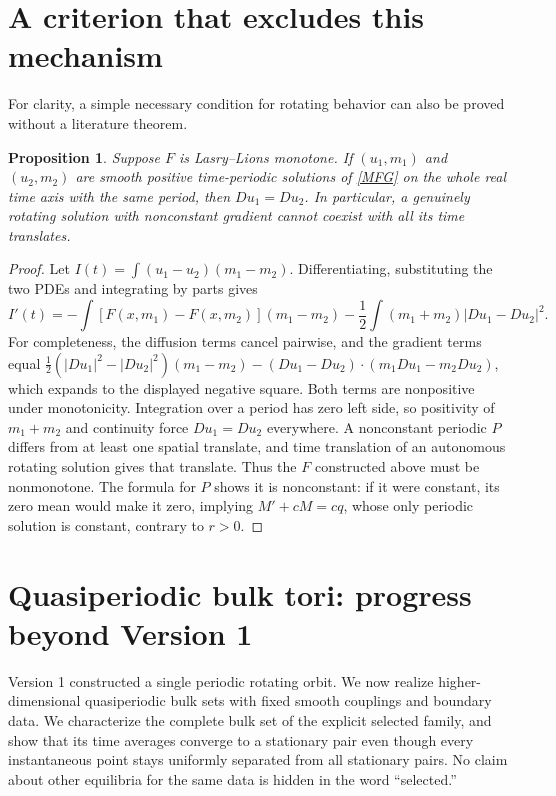 \documentclass[11pt]{article}
\newtheorem{proposition}[theorem]{Proposition}
\begin{document}
\section{A criterion that excludes this mechanism}
For clarity, a simple necessary condition for rotating behavior can also be proved without a literature theorem.
\begin{proposition}\label{monotone}
Suppose $F$ is Lasry--Lions monotone. If $(u_1,m_1)$ and $(u_2,m_2)$ are smooth positive time-periodic solutions of \eqref{MFG} on the whole real time axis with the same period, then $D u_1=D u_2$. In particular, a genuinely rotating solution with nonconstant gradient cannot coexist with all its time translates.
\end{proposition}
\begin{proof}
Let $I(t)=\int(u_1-u_2)(m_1-m_2)$. Differentiating, substituting the two PDEs and integrating by parts gives
\[
 I'(t)=-\int[F(x,m_1)-F(x,m_2)](m_1-m_2)
       -\frac12\int(m_1+m_2)|Du_1-Du_2|^2.
\]
For completeness, the diffusion terms cancel pairwise, and the gradient terms equal
$\tfrac12(|Du_1|^2-|Du_2|^2)(m_1-m_2)
-(Du_1-Du_2)\cdot(m_1Du_1-m_2Du_2)$,
which expands to the displayed negative square. Both terms are nonpositive under monotonicity. Integration over a period has zero left side, so positivity of $m_1+m_2$ and continuity force $Du_1=Du_2$ everywhere. A nonconstant periodic $P$ differs from at least one spatial translate, and time translation of an autonomous rotating solution gives that translate. Thus the $F$ constructed above must be nonmonotone. The formula for $P$ shows it is nonconstant: if it were constant, its zero mean would make it zero, implying $M'+cM=cq$, whose only periodic solution is constant, contrary to $r>0$.
\end{proof}

\section{Quasiperiodic bulk tori: progress beyond Version 1}
Version 1 constructed a single periodic rotating orbit. We now realize
higher-dimensional quasiperiodic bulk sets with fixed smooth couplings
and boundary data. We characterize the complete bulk set of the explicit
selected family, and show that its time averages converge to a stationary
pair even though every instantaneous point stays uniformly separated
from all stationary pairs. No claim about other equilibria for the same
data is hidden in the word ``selected.''
\end{document}

